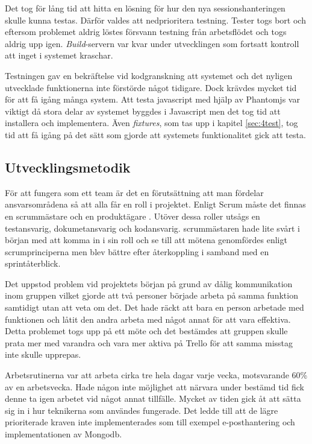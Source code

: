 Det tog för lång tid att hitta en lösning för hur den nya sessionshanteringen skulle kunna testas. Därför valdes att nedprioritera testning. Tester togs bort och eftersom problemet aldrig löstes försvann testning från arbetsflödet och togs aldrig upp igen. \emph{Build}-servern var kvar under utvecklingen som fortsatt kontroll att inget i systemet kraschar.

Testningen gav en bekräftelse vid kodgranskning att systemet och det nyligen
utvecklade funktionerna inte förstörde något tidigare. Dock krävdes mycket tid
för att få igång många system. Att testa javascript med hjälp av Phantomjs var
viktigt då stora delar av systemet byggdes i Javascript men det tog tid att
installera och implementera. Även \emph{fixtures}, som tas upp i kapitel
\ref{sec:4test}, tog tid att få igång på det sätt som gjorde att systemets
funktionalitet gick att testa.

\subsection{Utvecklingsmetodik}

För att fungera som ett team är det en förutsättning att man fördelar
ansvarsområdena så att alla får en roll i projektet. Enligt Scrum måste det
finnas en scrummästare och en produktägare . Utöver dessa roller utsågs en
testansvarig, dokumetansvarig och kodansvarig. scrummästaren hade lite svårt i
början med att komma in i sin roll och se till att mötena genomfördes enligt
scrumprinciperna men blev bättre efter återkoppling i samband med en
sprintåterblick.

Det uppstod problem vid projektets början på grund av dålig kommunikation inom
gruppen vilket gjorde att två personer började arbeta på samma funktion
samtidigt utan att veta om det. Det hade räckt att bara en person arbetade med
funktionen och låtit den andra arbeta med något annat för att vara effektiva.
Detta problemet togs upp på ett möte och det bestämdes att gruppen skulle prata
mer med varandra och vara mer aktiva på Trello för att samma misstag inte
skulle upprepas.

Arbetsrutinerna var att arbeta cirka tre hela dagar varje vecka, motsvarande
60\% av en arbetsvecka. Hade någon inte möjlighet att närvara under bestämd tid
fick denne ta igen arbetet vid något annat tillfälle. Mycket av tiden gick åt
att sätta sig in i hur teknikerna som användes fungerade. Det ledde till att de
lägre prioriterade kraven inte implementerades som till exempel e-posthantering
och implementationen av Mongodb.

